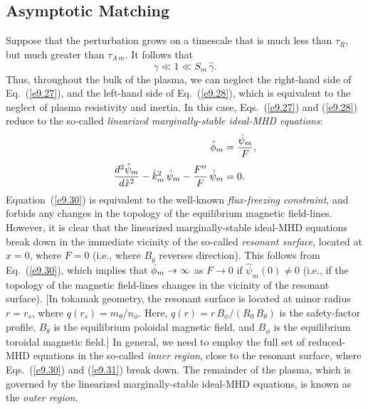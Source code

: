 \documentclass[12pt,prb,aps]{revtex4-1}
\begin{document}
\subsection{Asymptotic Matching}
Suppose that the perturbation   grows on a timescale that is much less than $\tau_R$, but much greater than
$\tau_{A\,m}$. It follows that
\begin{equation}\label{e9.29}
\hat{\gamma} \ll 1 \ll S_m\,\hat{\gamma}.
\end{equation}
Thus, throughout the bulk of the plasma, we can neglect the right-hand side of Eq.~(\ref{e9.27}), and the left-hand side of Eq.~(\ref{e9.28}), which is equivalent to the neglect of plasma resistivity and inertia. In this case,
Eqs.~(\ref{e9.27}) and (\ref{e9.28}) reduce to the so-called {\em linearized marginally-stable ideal-MHD equations}:
\begin{align}
\skew{3}\hat{\phi}_m &= \frac{\hat{\psi}_m}{F},\label{e9.30}\\[0.5ex]
\frac{d^2\hat{\psi}_m}{d\hat{x}^2} - \hat{k}_m^2\,\hat{\psi}_m-\frac{F''}{F}\,\hat{\psi}_m &= 0.\label{e9.31}
\end{align}
Equation~(\ref{e9.30}) is equivalent to the well-known {\em flux-freezing constraint},\cite{fried} and forbids any changes in the
topology of the equilibrium magnetic field-lines. 
However, it is clear that the linearized marginally-stable ideal-MHD  equations break down in the
immediate vicinity of the so-called {\em resonant surface}, located at $x=0$,  where $F=0$ (i.e., where $B_y$ reverses direction). This follows from Eq.~(\ref{e9.30}), which implies that $\skew{3}\hat{\phi}_m\rightarrow\infty$ as $F\rightarrow 0$ if $\hat{\psi}_m(0)\neq 0$ (i.e., if the topology of the magnetic
field-lines changes in the  vicinity of the resonant surface). [In tokamak geometry, the resonant surface is located at
minor radius $r=r_s$, where 
$q(r_s)=m_\theta/n_\phi$. Here, $q(r)=r\,B_\phi/(R_0\,B_\theta)$ is the safety-factor profile, $B_\theta$ is the 
equilibrium poloidal magnetic field, and $B_\phi$ is the equilibrium toroidal magnetic field.\cite{wesson}]
 In general, we need to employ the full set of reduced-MHD equations in the so-called {\em inner region}, close to the resonant
surface, where Eqs.~(\ref{e9.30}) and (\ref{e9.31}) break down. The remainder of the plasma,
which is governed by the linearized marginally-stable ideal-MHD  equations, is known as the {\em outer region}. 
\end{document}
